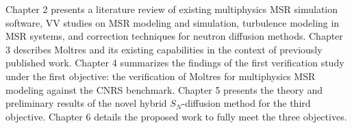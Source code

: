 Chapter 2 presents a literature review of existing multiphysics \gls{MSR} simulation software,
\gls{VV} studies on \gls{MSR} modeling and simulation, turbulence modeling in \gls{MSR} systems,
and correction techniques for neutron diffusion methods.
Chapter 3 describes Moltres and its existing capabilities in the context of previously published
work.
Chapter 4 summarizes the findings of the first verification study under the first objective: the
verification of Moltres for multiphysics \gls{MSR} modeling against the CNRS benchmark.
Chapter 5 presents the theory and preliminary results of the novel hybrid $S_N$-diffusion
method for the third objective.
Chapter 6 details the proposed work to fully meet the three objectives.
